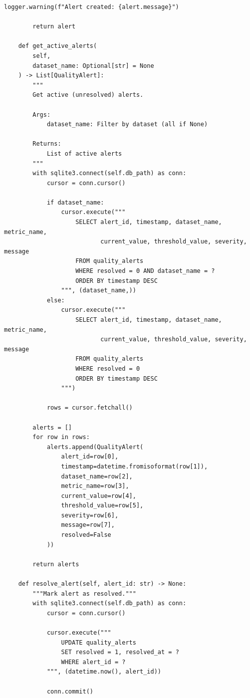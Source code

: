\begin{lstlisting}[style=python, caption={Real-time quality monitoring with SQLite backend}]
        logger.warning(f"Alert created: {alert.message}")

        return alert

    def get_active_alerts(
        self,
        dataset_name: Optional[str] = None
    ) -> List[QualityAlert]:
        """
        Get active (unresolved) alerts.

        Args:
            dataset_name: Filter by dataset (all if None)

        Returns:
            List of active alerts
        """
        with sqlite3.connect(self.db_path) as conn:
            cursor = conn.cursor()

            if dataset_name:
                cursor.execute("""
                    SELECT alert_id, timestamp, dataset_name, metric_name,
                           current_value, threshold_value, severity, message
                    FROM quality_alerts
                    WHERE resolved = 0 AND dataset_name = ?
                    ORDER BY timestamp DESC
                """, (dataset_name,))
            else:
                cursor.execute("""
                    SELECT alert_id, timestamp, dataset_name, metric_name,
                           current_value, threshold_value, severity, message
                    FROM quality_alerts
                    WHERE resolved = 0
                    ORDER BY timestamp DESC
                """)

            rows = cursor.fetchall()

        alerts = []
        for row in rows:
            alerts.append(QualityAlert(
                alert_id=row[0],
                timestamp=datetime.fromisoformat(row[1]),
                dataset_name=row[2],
                metric_name=row[3],
                current_value=row[4],
                threshold_value=row[5],
                severity=row[6],
                message=row[7],
                resolved=False
            ))

        return alerts

    def resolve_alert(self, alert_id: str) -> None:
        """Mark alert as resolved."""
        with sqlite3.connect(self.db_path) as conn:
            cursor = conn.cursor()

            cursor.execute("""
                UPDATE quality_alerts
                SET resolved = 1, resolved_at = ?
                WHERE alert_id = ?
            """, (datetime.now(), alert_id))

            conn.commit()


\end{lstlisting}
